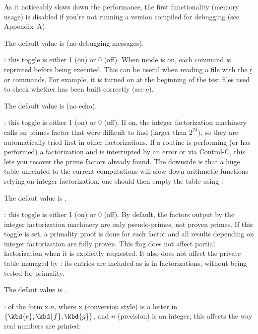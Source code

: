  As it noticeably slows down the performance,
the first functionality (memory usage) is disabled if you're not running a
version compiled for debugging (see Appendix~A).

The default value is  (no debugging messages).

: \label{se:def,echo}this toggle is either 1 (on) or 0 (off). When 
mode is on, each command is reprinted before being executed. This can be
useful when reading a file with the \b{r} or  commands. For
example, it is turned on at the beginning of the test files used to check
whether  has been built correctly (see \b{e}).

The default value is  (no echo).

: \label{se:def,factor_add_primes}this toggle is either 1 (on) or 0 (off). If on,
the integer factorization machinery calls  on primes
factor that were difficult to find (larger than $2^24$), so they are
automatically tried first in other factorizations. If a routine is performing
(or has performed) a factorization and is interrupted by an error or via
Control-C, this lets you recover the prime factors already found. The
downside is that a huge  table unrelated to the current
computations will slow down arithmetic functions relying on integer
factorization; one should then empty the table using .

The defaut value is .

: \label{se:def,factor_proven}this toggle is either 1 (on) or 0 (off). By
default, the factors output by the integer factorization machinery are
only pseudo-primes, not proven primes. If this toggle is
set, a primality proof is done for each factor and all results depending on
integer factorization are fully proven. This flag does not affect partial
factorization when it is explicitly requested. It also does not affect the
private table managed by : its entries are included as is in
factorizations, without being tested for primality.

The defaut value is .

: \label{se:def,format}of the form x$.n$, where x (conversion style)
is a letter in $\{\kbd{e},\kbd{f},\kbd{g}\}$, and $n$ (precision) is an
integer; this affects the way real numbers are printed:

